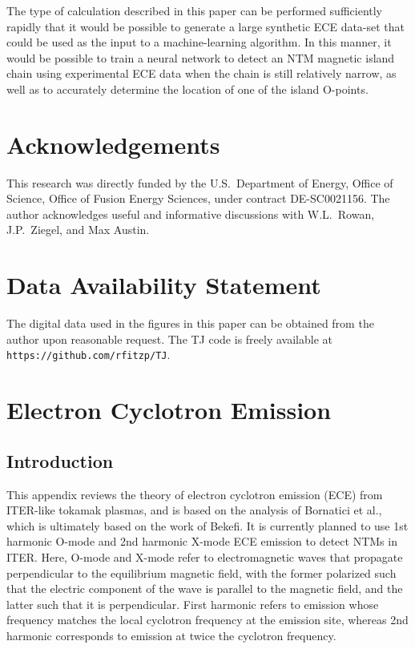 \documentclass[12pt,prb,aps]{revtex4-1}
\begin{document}
The type of calculation described in this paper can be performed sufficiently rapidly that it would be possible to generate a large synthetic ECE data-set
that could be used as the input to a machine-learning algorithm. In this manner, it would be possible to train a neural network to  detect an NTM magnetic
island chain using experimental ECE data when the chain is still relatively narrow, as well as to accurately determine the location of one of the island O-points. 

\section*{Acknowledgements}
This research was directly funded by the U.S.\ Department of Energy, Office of Science, Office of Fusion Energy Sciences, under  contract DE-SC0021156. 
The author acknowledges useful and informative discussions with W.L.~Rowan, J.P.~Ziegel, and Max Austin.

\section*{Data Availability Statement}
The digital data used in the figures in this paper can be obtained from the author upon reasonable request. The TJ code is freely 
available at {\tt https://github.com/rfitzp/TJ}. 

\appendix
\section{Electron Cyclotron Emission}\label{sece}
\subsection{Introduction}
This appendix reviews the theory of electron cyclotron emission (ECE) from ITER-like tokamak plasmas, and is based on the analysis of Bornatici et al.,\cite{bornatici}
which is ultimately based on the work of Bekefi.\cite{bekefi}
It is  currently planned to use 1st harmonic O-mode  and 2nd harmonic X-mode ECE emission to detect NTMs in ITER.\cite{ece4a} Here, O-mode and
X-mode refer to electromagnetic waves that propagate perpendicular to the equilibrium magnetic field, with the former polarized such that the electric component of
the wave is parallel to the magnetic field, and the latter such that it is perpendicular.\cite{plasma} First harmonic refers to emission whose frequency matches the local
cyclotron frequency at the emission site, whereas 2nd harmonic corresponds to emission at twice the cyclotron frequency.\cite{plasma}
\end{document}
